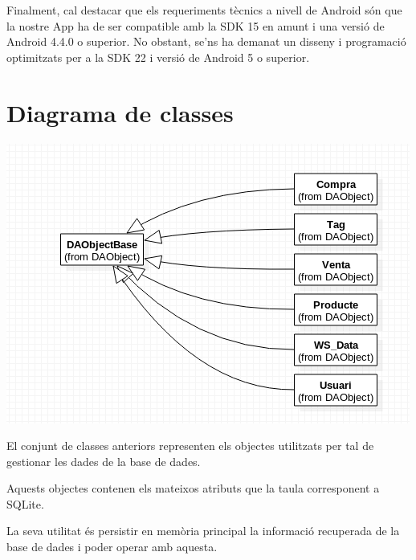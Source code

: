 \documentclass{article}
\begin{document}
Finalment, cal destacar que els requeriments tècnics a nivell de Android són que la nostre App ha de ser compatible amb la SDK 15 en amunt i una versió de Android 4.4.0 o superior. No obstant, se'ns ha demanat un disseny i programació optimitzats per a la SDK 22 i versió de Android 5 o superior.


\section{Diagrama de classes}

\begin{center}
	\includegraphics[scale=0.5]{img/1.png}
	 \end{center}
		El conjunt de classes anteriors representen els objectes utilitzats per tal de gestionar les dades de la base de dades.

Aquests objectes contenen els mateixos atributs que la taula corresponent a SQLite.

La seva utilitat és persistir en memòria principal la informació recuperada de la base de dades i poder operar amb aquesta.
\end{document}
